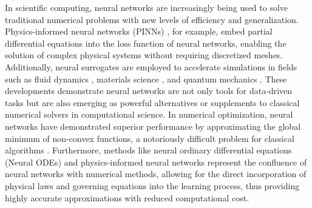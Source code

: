 \documentclass[final]{siamart220329}
\newtheorem{theoretical insights}{Theoretical insights}
\newtheorem{practical takeaway}{Practical takeaway}
\begin{document}
In scientific computing, neural networks are increasingly being used to solve traditional numerical problems with new levels of efficiency and generalization. Physics-informed neural networks (PINNs) \cite{raissi2019physics}, for example, embed partial differential equations into the loss function of neural networks, enabling the solution of complex physical systems without requiring discretized meshes. Additionally, neural surrogates are employed to accelerate simulations in fields such as fluid dynamics \cite{cai2021physics}, materials science \cite{xie2018crystal,noe2020machine}, and quantum mechanics \cite{carleo2017solving}. These developments demonstrate neural networks are not only tools for data-driven tasks but are also emerging as powerful alternatives or supplements to classical numerical solvers in computational science. 
In numerical optimization, neural networks have demonstrated superior performance by approximating the global minimum of non-convex functions, a notoriously difficult problem for classical algorithms \cite{mnih2015human}. Furthermore, methods like neural ordinary differential equations (Neural ODEs) \cite{Chen2018neural} and physics-informed neural networks \cite{raissi2019physics} represent the confluence of neural networks with numerical methods, allowing for the direct incorporation of physical laws and governing equations into the learning process, thus providing highly accurate approximations with reduced computational cost. %
\end{document}
